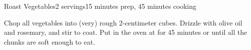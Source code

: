 \documentclass[../Cookbook.tex]{subfiles}
\begin{document}
\begin{recipe}{Roast Vegetables}{2 servings}{15 minutes prep, 45 minutes cooking}

Chop all vegetables into (very) rough 2-centimeter cubes. Drizzle with olive oil and rosemary, and stir to coat. Put in the oven at  for 45 minutes or until all the chunks are soft enough to eat.

\end{recipe}
\end{document}
